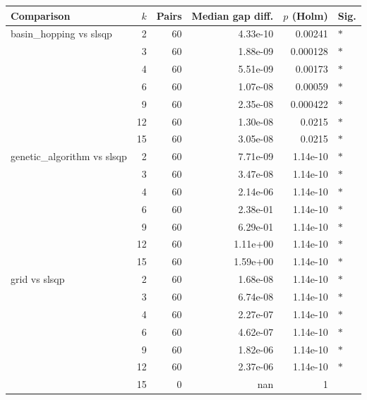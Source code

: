 \begin{tabular}{lrrrrl}
\toprule
Comparison & $k$ & Pairs & Median gap diff. & $p$ (Holm) & Sig. \\
\midrule
basin\_hopping vs slsqp & 2 & 60 & 4.33e-10 & 0.00241 & $\ast$ \\
 & 3 & 60 & 1.88e-09 & 0.000128 & $\ast$ \\
 & 4 & 60 & 5.51e-09 & 0.00173 & $\ast$ \\
 & 6 & 60 & 1.07e-08 & 0.00059 & $\ast$ \\
 & 9 & 60 & 2.35e-08 & 0.000422 & $\ast$ \\
 & 12 & 60 & 1.30e-08 & 0.0215 & $\ast$ \\
 & 15 & 60 & 3.05e-08 & 0.0215 & $\ast$ \\
\addlinespace
genetic\_algorithm vs slsqp & 2 & 60 & 7.71e-09 & 1.14e-10 & $\ast$ \\
 & 3 & 60 & 3.47e-08 & 1.14e-10 & $\ast$ \\
 & 4 & 60 & 2.14e-06 & 1.14e-10 & $\ast$ \\
 & 6 & 60 & 2.38e-01 & 1.14e-10 & $\ast$ \\
 & 9 & 60 & 6.29e-01 & 1.14e-10 & $\ast$ \\
 & 12 & 60 & 1.11e+00 & 1.14e-10 & $\ast$ \\
 & 15 & 60 & 1.59e+00 & 1.14e-10 & $\ast$ \\
\addlinespace
grid vs slsqp & 2 & 60 & 1.68e-08 & 1.14e-10 & $\ast$ \\
 & 3 & 60 & 6.74e-08 & 1.14e-10 & $\ast$ \\
 & 4 & 60 & 2.27e-07 & 1.14e-10 & $\ast$ \\
 & 6 & 60 & 4.62e-07 & 1.14e-10 & $\ast$ \\
 & 9 & 60 & 1.82e-06 & 1.14e-10 & $\ast$ \\
 & 12 & 60 & 2.37e-06 & 1.14e-10 & $\ast$ \\
 & 15 & 0 & nan & 1 &  \\
\bottomrule
\end{tabular}